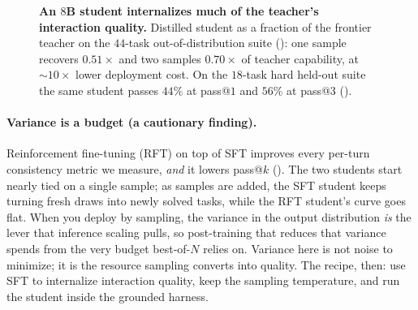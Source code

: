 \begin{figure}[t]
\centering
{}
\caption{\textbf{An $8$B student internalizes much of the teacher's interaction quality.} Distilled student as a fraction of the frontier teacher on the $44$-task out-of-distribution suite (): one sample recovers $0.51\times$ and two samples $0.70\times$ of teacher capability, at ${\sim}10\times$ lower deployment cost. On the $18$-task hard held-out suite the same student passes $44\%$ at pass@$1$ and $56\%$ at pass@$3$ ().}
\label{fig:distill}
\end{figure}

\paragraph{Variance is a budget (a cautionary finding).} Reinforcement fine-tuning (RFT) on top of SFT improves every per-turn consistency metric we measure, \emph{and} it lowers pass@$k$ (). The two students start nearly tied on a single sample; as samples are added, the SFT student keeps turning fresh draws into newly solved tasks, while the RFT student's curve goes flat. When you deploy by sampling, the variance in the output distribution \emph{is} the lever that inference scaling pulls, so post-training that reduces that variance spends from the very budget best-of-$N$ relies on. Variance here is not noise to minimize; it is the resource sampling converts into quality. The recipe, then: use SFT to internalize interaction quality, keep the sampling temperature, and run the student inside the grounded harness.

